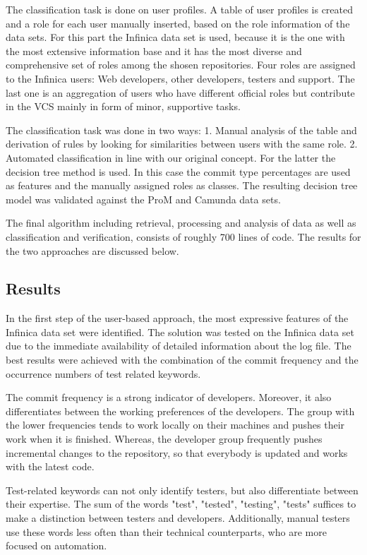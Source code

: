 The classification task is done on user profiles. A table of user profiles is created and a role for each user manually inserted, based on the role information of the data sets. For this part the Infinica data set is used, because it is the one with the most extensive information base and it has the most diverse and comprehensive set of roles among the shosen repositories. Four roles are assigned to the Infinica users: Web developers, other developers, testers and support. The last one is an aggregation of users who have different official roles but contribute in the VCS mainly in form of minor, supportive tasks.

The classification task was done in two ways: 1. Manual analysis of the table and derivation of rules by looking for similarities between users with the same role. 2. Automated classification in line with our original concept. For the latter the decision tree method is used. In this case the commit type percentages are used as features and the manually assigned roles as classes. The resulting decision tree model was validated against the ProM and Camunda data sets.


The final algorithm including retrieval, processing and analysis of data as well as classification and verification, consists of roughly 700 lines of code. The results for the two approaches are discussed below.


\subsection{Results}

In the first step of the user-based approach, the most expressive features of the Infinica data set were identified. The solution was tested on the Infinica data set due to the immediate availability of detailed information about the log file. The best results were achieved with the combination of the commit frequency and the occurrence numbers of test related keywords.


The commit frequency is a strong indicator of developers. Moreover, it also differentiates between the working preferences of the developers. The group with the lower frequencies tends to work locally on their machines and pushes their work when it is finished. Whereas, the developer group frequently pushes incremental changes to the repository, so that everybody is updated and works with the latest code.


Test-related keywords can not only identify testers, but also differentiate between their expertise. The sum of the words "test", "tested", "testing", "tests" suffices to make a distinction between testers and developers. Additionally, manual testers use these words less often than their technical counterparts, who are more focused on automation.


